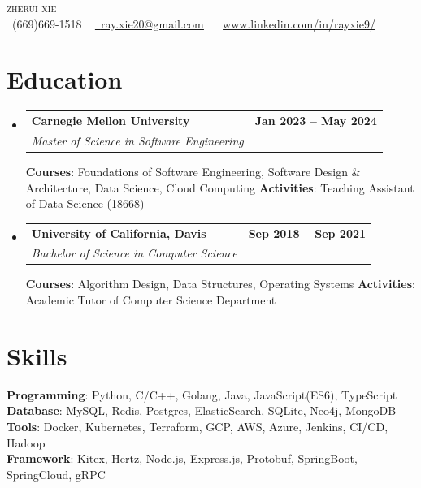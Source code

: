 \documentclass[letterpaper,11pt]{article}
\makeatletter
\newcommand{\resumeSubheading}[4]{
    \vspace{-2pt}\item
      \begin{tabular*}{1.0\textwidth}[t]{l@{\extracolsep{\fill}}r}
        \textbf{#1} & \textbf{\small #2} \\
        \textit{\small#3} & \textit{\small #4} \\
      \end{tabular*}\vspace{-7pt}
  }
\newcommand{\resumeSubHeadingListStart}{\begin{itemize}[leftmargin=0.0in,
  label={}]}
\newcommand{\resumeSubHeadingListEnd}{\end{itemize}}
\makeatother
\begin{document}
  \begin{center}
      {\LARGE \scshape zherui xie} \\ \vspace{1pt}
      \small
      \raisebox{-0.1\height}\faPhone\ (669)669-1518 ~
  \href{mailto:ray.xie20@gmail.com}{\raisebox{-0.2\height}\faEnvelope\
  \underline{ray.xie20@gmail.com}} ~ \raisebox{-0.1\height}\faLinkedin\
  \href{https://www.linkedin.com/in/rayxie9/}{www.linkedin.com/in/rayxie9/}
      \vspace{-16pt}
  \end{center}

  \section{Education}
  \large
    \resumeSubHeadingListStart
      \resumeSubheading
        {Carnegie Mellon University}{Jan 2023 -- May 2024}
        {Master of Science in Software Engineering}{}
         {\textbf{Courses}: Foundations of Software Engineering, Software
  Design \& Architecture, Data Science, Cloud Computing}{}
         {\textbf{Activities}: Teaching Assistant of Data Science (18668)}{}
      \resumeSubheading
        {University of California, Davis}{Sep 2018 -- Sep 2021}
        {Bachelor of Science in Computer Science}{}
         {\textbf{Courses}: Algorithm Design, Data Structures, Operating
  Systems}{}
         {\textbf{Activities}: Academic Tutor of Computer Science Department}{}
    \resumeSubHeadingListEnd

  \section{Skills}
   \begin{itemize}[leftmargin=0.15in, label={}]
  \small
  {\item{
      \textbf{Programming}{: Python, C/C++, Golang, Java, JavaScript(ES6),
  TypeScript}\\
      \textbf{Database}{: MySQL, Redis, Postgres, ElasticSearch, SQLite, Neo4j,
   MongoDB}\\
      \textbf{Tools}{: Docker, Kubernetes, Terraform, GCP, AWS, Azure, Jenkins,
   CI/CD, Hadoop}\\
      \textbf{Framework}{: Kitex, Hertz, Node.js, Express.js, Protobuf,
  SpringBoot, SpringCloud, gRPC}\\
  }}
   \end{itemize}
\end{document}
